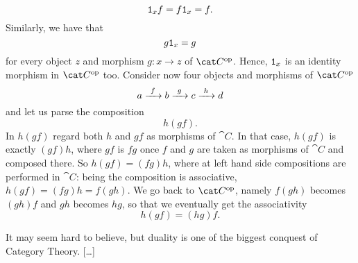 \[\mathtt 1_x f = f \mathtt 1_x = f .\]
Similarly, we have that
\[g \mathtt 1_x  = g\]
for every object \(z\) and morphism \(g : x \to z\) of \(\op{\cat C}\). Hence, \(\mathtt 1_x\) is an identity morphism in \(\op{\cat C}\) too. Consider now four objects and morphisms of \(\op{\cat C}\)
\[a \xrightarrow{\ f\ } b \xrightarrow{\ g\ } c \xrightarrow{\ h\ } d\]
and let us parse the composition
\[h(gf) .\]
In \(h(gf)\) regard both \(h\) and \(gf\) as morphisms of \(\cat C\). In that case, \(h(gf)\) is exactly \((gf)h\), where \(gf\) is \(fg\) once \(f\) and \(g\) are taken as morphisms of \(\cat C\) and composed there. So \(h(gf) = (fg)h\), where at left hand side compositions are performed in \(\cat C\): being the composition is associative, \(h(gf) = (fg)h = f(gh)\). We go back to \(\op{\cat C}\), namely \(f(gh)\) becomes \((gh)f\) and \(gh\) becomes \(hg\), so that we eventually get the associativity
\[h(gf) = (hg) f .\]

It may seem hard to believe, but duality is one of the biggest conquest of Category Theory. [\dots{}]

